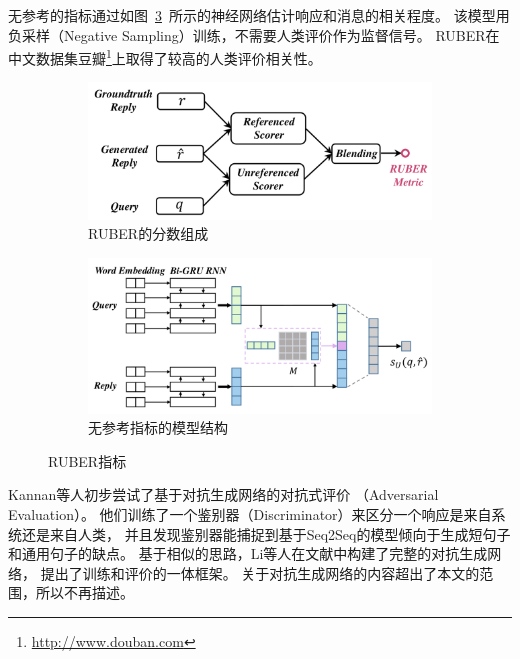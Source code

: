 无参考的指标通过如图~\ref{fig:RUBER_unref_model}~所示的神经网络估计响应和消息的相关程度。
该模型用负采样（Negative Sampling）训练，不需要人类评价作为监督信号。
RUBER在中文数据集豆瓣\footnote{\url{http://www.douban.com}}上取得了较高的人类评价相关性。
\begin{figure}[H]
    \begin{subfigure}{0.45\linewidth}
        \centering
        \includegraphics[width=\linewidth]{figure/RUBER_overview.png}
        \caption{RUBER的分数组成}
        \label{fig:RUBER_components}
    \end{subfigure}%
    \begin{subfigure}{0.45\linewidth}
        \centering
        \includegraphics[width=\linewidth]{figure/RUBER_model.png}
        \caption{无参考指标的模型结构}
        \label{fig:RUBER_unref_model}
    \end{subfigure}
    \centering
    \caption{RUBER指标}
\end{figure}

Kannan等人初步尝试了基于对抗生成网络的对抗式评价
（Adversarial Evaluation）。
他们训练了一个鉴别器（Discriminator）来区分一个响应是来自系统还是来自人类，
并且发现鉴别器能捕捉到基于Seq2Seq的模型倾向于生成短句子和通用句子的缺点。
基于相似的思路，Li等人在文献\cite{Adversarial}中构建了完整的对抗生成网络，
提出了训练和评价的一体框架。
关于对抗生成网络的内容超出了本文的范围，所以不再描述。

